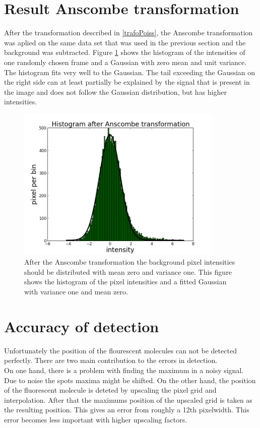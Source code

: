 \section{Result Anscombe transformation}
After the transformation described in \ref{trafoPoiss}, the Anscombe transformation was aplied on the same data set that was used in the previous section and the background was subtracted. Figure \ref{isitAnscombe} shows the histogram of the intensities of one randomly chosen frame and a Gaussian with zero mean and unit variance. The histogram fits very well to the Gaussian. The tail exceeding the Gaussian on the right side can at least partially be explained by the signal that is present in the image and does not follow the Gaussian distribution, but has higher intensities.
\begin{figure}
\centering
\includegraphics[width = 0.88\textwidth]{pictures/anscombeAndFit.png}
	 \caption{After the Anscombe transformation the background pixel intensities should be distributed with mean zero and variance one. This figure shows the histogram of the pixel intensities and a fitted Gaussian with variance one and mean zero.}
	\label{isitAnscombe}
\end{figure}

\section{Accuracy of detection}
Unfortunately the position of the flourescent molecules can not be detected
perfectly. There are two main contribution to the errors in detection.\\
On one hand, there is a problem with finding the maximum in a noisy signal. Due to
noise the spots maxima might be shifted.\newline
On the other hand, the position of the fluorescent molecule is deteted by upscaling the pixel grid and interpolation.
After that the maximums position of the upscaled grid is taken as the resulting
position. This gives an error from roughly a 12th pixelwidth. This error becomes less important with higher upscaling factors.\newline

